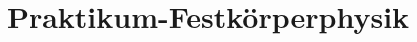 

\subject{Photoluminezsenz (PL)}
\title{Praktikum-Festkörperphysik}


\maketitle
\thispagestyle{empty}
\tableofcontents
\newpage

%
%
%



\nocite{*}


